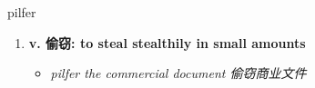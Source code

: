 
\begin{frame}
{\huge pilfer}
\begin{center}
\begin{enumerate}\Large
  \item \textbf{v. 偷窃: to steal stealthily in small amounts}
  \begin{itemize}
    \item \em{\Large{pilfer the commercial document 偷窃商业文件}}
  \end{itemize}
\end{enumerate}
\end{center}
\end{frame}
